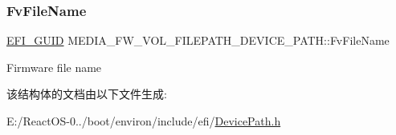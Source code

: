 \subsubsection{\texorpdfstring{Fv\+File\+Name}{FvFileName}}
{\footnotesize\ttfamily \hyperlink{_uefi_base_type_8h_ad87614428813f71edb2c2d802e9ce2af}{E\+F\+I\+\_\+\+G\+U\+ID} M\+E\+D\+I\+A\+\_\+\+F\+W\+\_\+\+V\+O\+L\+\_\+\+F\+I\+L\+E\+P\+A\+T\+H\+\_\+\+D\+E\+V\+I\+C\+E\+\_\+\+P\+A\+T\+H\+::\+Fv\+File\+Name}

Firmware file name 

该结构体的文档由以下文件生成\+:\begin{DoxyCompactItemize}
\item 
E\+:/\+React\+O\+S-\/0../boot/environ/include/efi/\hyperlink{_device_path_8h}{Device\+Path.\+h}\end{DoxyCompactItemize}
